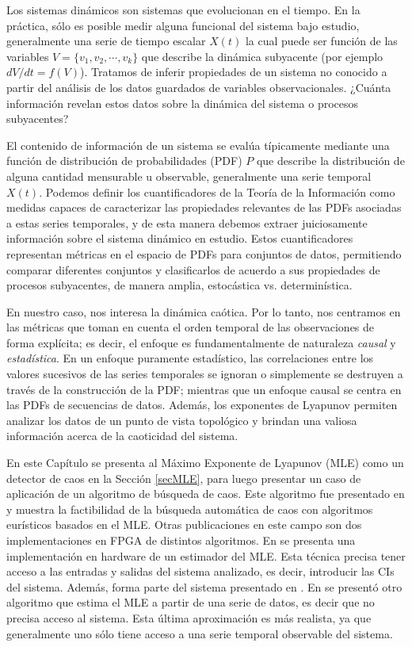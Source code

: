 Los sistemas dinámicos son sistemas que evolucionan en el tiempo.
En la práctica, sólo es posible medir alguna funcional del sistema bajo estudio, generalmente una serie de tiempo escalar $X(t)$ la cual puede ser función de las variables $V=\{ v_1, v_2,\cdots, v_k\}$ que describe la dinámica subyacente (por ejemplo $dV/dt=f(V)$).
Tratamos de inferir propiedades de un sistema no conocido a partir del análisis de los datos guardados de variables observacionales.
¿Cuánta información revelan estos datos sobre la dinámica del sistema o procesos subyacentes?

El contenido de información de un sistema se evalúa típicamente mediante una función de distribución de probabilidades (PDF) $P$ que describe la distribución de alguna cantidad mensurable u observable, generalmente una serie temporal $X(t)$.
Podemos definir los cuantificadores de la Teoría de la Información como medidas capaces de caracterizar las propiedades relevantes de las PDFs asociadas a estas series temporales, y de esta manera debemos extraer juiciosamente información sobre el sistema dinámico en estudio.
Estos cuantificadores representan métricas en el espacio de PDFs para conjuntos de datos, permitiendo comparar diferentes conjuntos y clasificarlos de acuerdo a sus propiedades de procesos subyacentes, de manera amplia, estocástica vs. determinística.

En nuestro caso, nos interesa la dinámica caótica.
Por lo tanto, nos centramos en las métricas que toman en cuenta el orden temporal de las observaciones de forma explícita; es decir, el enfoque es fundamentalmente de naturaleza \textit{causal} y \textit{estadística}.
En un enfoque puramente estadístico, las correlaciones entre los valores sucesivos de las series temporales se ignoran o simplemente se destruyen a través de la construcción de la PDF; mientras que un enfoque causal se centra en las PDFs de secuencias de datos.
Además, los exponentes de Lyapunov permiten analizar los datos de un punto de vista topológico y brindan una valiosa información acerca de la caoticidad del sistema.

En este Capítulo se presenta al Máximo Exponente de Lyapunov (MLE) como un detector de caos en la Sección \ref{secMLE}, para luego presentar un caso de aplicación de un algoritmo de búsqueda de caos.
Este algoritmo fue presentado en \cite{CASE2013} y muestra la factibilidad de la búsqueda automática de caos con algoritmos eurísticos basados en el  MLE.
Otras publicaciones en este campo son dos implementaciones en FPGA de distintos algoritmos.
En \cite{DeMicco2013} se presenta una implementación en hardware de un estimador del MLE.
Esta técnica precisa tener acceso a las entradas y salidas del sistema analizado, es decir, introducir las CIs del sistema.
Además, forma parte del sistema presentado en \cite{CASE2013}.
En \cite{LASCAS2017} se presentó otro algoritmo que estima el MLE a partir de una serie de datos, es decir que no precisa acceso al sistema.
Esta última aproximación es más realista, ya que generalmente uno sólo tiene acceso a una serie temporal observable del sistema.

